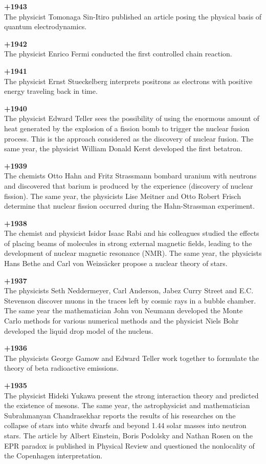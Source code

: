 \textbf{+1943}\\
The physicist Tomonaga Sin-Itiro published an article posing the physical basis of quantum electrodynamics.

\textbf{+1942}\\
The physicist Enrico Fermi conducted the first controlled chain reaction.

\textbf{+1941}\\
The physicist Ernst Stueckelberg interprets positrons as electrons with positive energy traveling back in time.

\textbf{+1940}\\
The physicist Edward Teller sees the possibility of using the enormous amount of heat generated by the explosion of a fission bomb to trigger the nuclear fusion process. This is the approach considered as the discovery of nuclear fusion. The same year, the physicist William Donald Kerst developed the first betatron.

\textbf{+1939}\\
The chemists Otto Hahn and Fritz Strassmann bombard uranium with neutrons and discovered that barium is produced by the experience (discovery of nuclear fission). The same year, the physicists Lise Meitner and Otto Robert Frisch determine that nuclear fission occurred during the Hahn-Strassman experiment.

\textbf{+1938}\\
The chemist and physicist Isidor Isaac Rabi and his colleagues studied the effects of placing beams of molecules in strong external magnetic fields, leading to the development of nuclear magnetic resonance (NMR). The same year, the physicists Hans Bethe and Carl von Weizsäcker propose a nuclear theory of stars.

\textbf{+1937}\\
The physicists Seth Neddermeyer, Carl Anderson, Jabez Curry Street and E.C. Stevenson discover muons in the traces left by cosmic rays in a bubble chamber. The same year the mathematician John von Neumann developed the Monte Carlo methods for various numerical methods and the physicist Niels Bohr developed the liquid drop model of the nucleus.

\textbf{+1936}\\
The physicists George Gamow and Edward Teller work together to formulate the theory of beta radioactive emissions. 

\textbf{+1935}\\
The physicist Hideki Yukawa present the strong interaction theory and predicted the existence of mesons. The same year, the astrophysicist and mathematician Subrahmanyan Chandrasekhar reports the results of his researches on the collapse of stars into white dwarfs and beyond 1.44 solar masses into neutron stars. The article by Albert Einstein, Boris Podolsky and Nathan Rosen on the EPR paradox is published in Physical Review and questioned the nonlocality of the Copenhagen interpretation.

